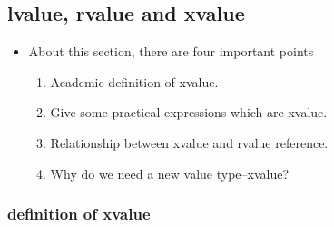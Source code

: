\documentclass[a4paper,12pt,twoside]{book}
\begin{document}
\subsection{lvalue, rvalue and xvalue}
\begin{itemize}

\item About this section, there are four important points

\begin{enumerate}
\item Academic definition of xvalue.
\item Give some practical expressions which are xvalue.
\item Relationship between xvalue and rvalue reference.
\item Why do we need a new value type--xvalue?
\end{enumerate}

\end{itemize}

\subsubsection{definition of xvalue}
\end{document}
